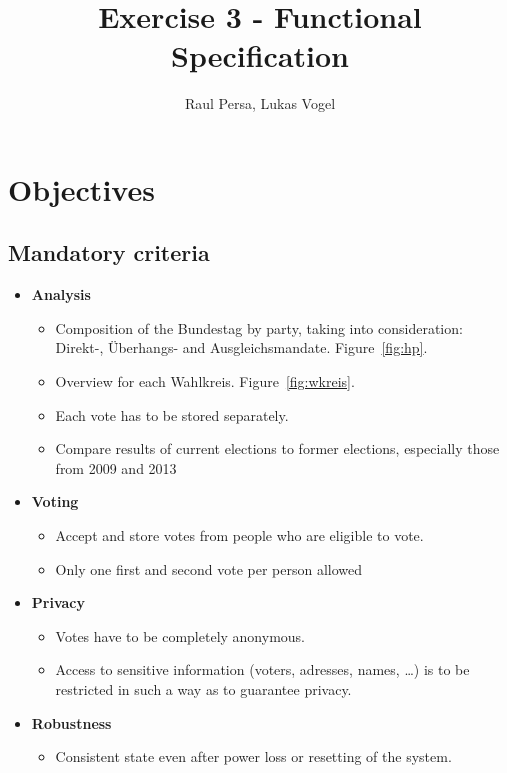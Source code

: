 \documentclass[10pt,a4paper]{article}
\author{Raul Persa, Lukas Vogel}
\title{Exercise 3 - Functional Specification}
\begin{document}
	\maketitle
	
\section{Objectives}

\subsection{Mandatory criteria}
	\begin{itemize}
		\item \textbf{Analysis}
			\begin{itemize}
				\item Composition of the Bundestag by party, taking into consideration: Direkt-, \"Uberhangs- and Ausgleichsmandate. Figure~\ref{fig:hp}.
			
				\item Overview for each Wahlkreis. Figure~\ref{fig:wkreis}.
			
				\item Each vote has to be stored separately.
			
				\item Compare results of current elections to former elections, especially those from 2009 and 2013
			\end{itemize}

		\item \textbf{Voting}
			\begin{itemize}
				\item Accept and store votes from people who are eligible to vote.
				
				\item Only one first and second vote per person allowed				
			\end{itemize}
		
		\item \textbf{Privacy}
			\begin{itemize}
				\item Votes have to be completely anonymous.
				\item Access to sensitive information (voters, adresses, names, \dots) is to be restricted in such a way as to guarantee privacy.
			\end{itemize}
			
		\item \textbf{Robustness}
			\begin{itemize}
				\item Consistent state even after power loss or resetting of the system.
			\end{itemize}
			


\end{itemize}
\end{document}
